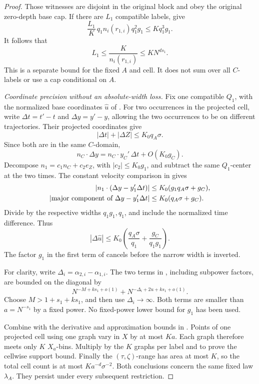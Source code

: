 \begin{proof}
Those witnesses are disjoint in the original block and obey the
original zero-depth base cap.  If there are \(L_1\) compatible
labels,  give
\[
 \frac{L_1}{K}\,q_1 n_i(r_{1,i})q_1^2g_1
     \le Kq_1^3g_1.
\]
It follows that
\begin{equation}
 \label{a08:compatible-count}
 L_1\le \frac{K}{n_i(r_{1,i})}\le KN^{ds_1}.
\end{equation}
This is a separate bound for the fixed \(A\) and cell.  It does not
sum over all \(C\)-labels or use a cap conditional on \(A\).

\emph{Coordinate precision without an absolute-width loss.}
Fix one compatible \(Q_1\), with the normalized base coordinates
\(\widehat u\) of .  For two occurrences in the projected cell,
write \(\Delta t=t'-t\) and \(\Delta y=y'-y\), allowing the two
occurrences to be on different trajectories.  Their projected
coordinates give
\[
 |\Delta t|+|\Delta Z|\le K_0q_A\sigma.
\]
Since both are in the same \(C\)-domain,
\[
 n_C\cdot\Delta y
   =n_C\cdot y_C'\,\Delta t+O(K_0g_C).
\]
Decompose \(n_1=c_1n_C+c_2e_Z\), with \(|c_2|\le K_0g_1\), and
subtract the same \(Q_1\)-center at the two times.  The constant
velocity comparison in  gives
\begin{align}
 \label{a08:normal-displacement}
 |n_1\cdot(\Delta y-y_1'\Delta t)|
 &\le K_0(g_1q_A\sigma+g_C),\\
 |\text{major component of }\Delta y-y_1'\Delta t|
 &\le K_0(q_A\sigma+g_C).
 \notag
\end{align}
Divide by the respective widths \(q_1g_1,q_1\), and include the
normalized time difference.  Thus
\begin{equation}
 \label{a08:relative-coordinate-error}
 |\Delta\widehat u|
 \le K_0\left(\frac{q_A\sigma}{q_1}
          +\frac{g_C}{q_1g_1}\right).
\end{equation}
The factor \(g_1\) in the first term of
 cancels before the narrow width is
inverted.

For clarity, write \(\Delta_i=\alpha_{2,i}-\alpha_{1,i}\).
The two terms in , including
subpower factors, are bounded on the diagonal by
\[
 N^{-M+ks_1+o(1)}
   +N^{-\Delta_i+2u+ks_1+o(1)}.
\]
Choose \(M>1+s_1+ks_1\), and then use \(\Delta_i\to\infty\).
Both terms are smaller than \(a=N^{-s_1}\) by a fixed power.
No fixed-power lower bound for \(g_1\) has been used.

Combine  with the derivative and
approximation bounds in . Points of one
projected cell using one graph vary in \(X\) by at most \(Ka\).
Each graph therefore meets only \(K\)
\(X_a\)-bins.  Multiply by the \(K\) graphs per label and
 to prove the cellwise support bound.
Finally the \((\tau,\zeta)\)-range has area at most \(K\), so the
total cell count is at most \(Ka^{-d}\sigma^{-2}\).
Both conclusions concern the same fixed law \(\lambda_A\).
They persist under every subsequent restriction.
\end{proof}

